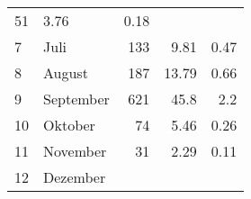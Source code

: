 \begin{longtable}{lXrrr}
       \num{51} &
       \num[round-mode=places,round-precision=2]{3,76} &
         \num[round-mode=places,round-precision=2]{0,18} \\

     7 &
     \multicolumn{1}{X}{ Juli   } &


       \num{133} &
       \num[round-mode=places,round-precision=2]{9,81} &
         \num[round-mode=places,round-precision=2]{0,47} \\

     8 &
     \multicolumn{1}{X}{ August   } &


       \num{187} &
       \num[round-mode=places,round-precision=2]{13,79} &
         \num[round-mode=places,round-precision=2]{0,66} \\

     9 &
     \multicolumn{1}{X}{ September   } &


       \num{621} &
       \num[round-mode=places,round-precision=2]{45,8} &
         \num[round-mode=places,round-precision=2]{2,2} \\

     10 &
     \multicolumn{1}{X}{ Oktober   } &


       \num{74} &
       \num[round-mode=places,round-precision=2]{5,46} &
         \num[round-mode=places,round-precision=2]{0,26} \\

     11 &
     \multicolumn{1}{X}{ November   } &


       \num{31} &
       \num[round-mode=places,round-precision=2]{2,29} &
         \num[round-mode=places,round-precision=2]{0,11} \\

     12 &
     \multicolumn{1}{X}{ Dezember   } &



\end{longtable}
